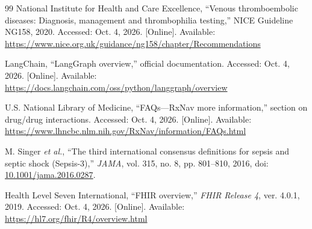 \documentclass[conference]{IEEEtran}
\begin{document}
\begin{thebibliography}{99}
National Institute for Health and Care Excellence, ``Venous thromboembolic diseases: Diagnosis, management and thrombophilia testing,'' NICE Guideline NG158, 2020. Accessed: Oct. 4, 2026. [Online]. Available: \url{https://www.nice.org.uk/guidance/ng158/chapter/Recommendations}

LangChain, ``LangGraph overview,'' official documentation. Accessed: Oct. 4, 2026. [Online]. Available: \url{https://docs.langchain.com/oss/python/langgraph/overview}

U.S. National Library of Medicine, ``FAQs---RxNav more information,'' section on drug/drug interactions. Accessed: Oct. 4, 2026. [Online]. Available: \url{https://www.lhncbc.nlm.nih.gov/RxNav/information/FAQs.html}

M. Singer \emph{et al.}, ``The third international consensus definitions for sepsis and septic shock (Sepsis-3),'' \emph{JAMA}, vol. 315, no. 8, pp. 801--810, 2016, doi: \href{https://doi.org/10.1001/jama.2016.0287}{10.1001/jama.2016.0287}.

Health Level Seven International, ``FHIR overview,'' \emph{FHIR Release 4}, ver. 4.0.1, 2019. Accessed: Oct. 4, 2026. [Online]. Available: \url{https://hl7.org/fhir/R4/overview.html}
\end{thebibliography}
\end{document}
